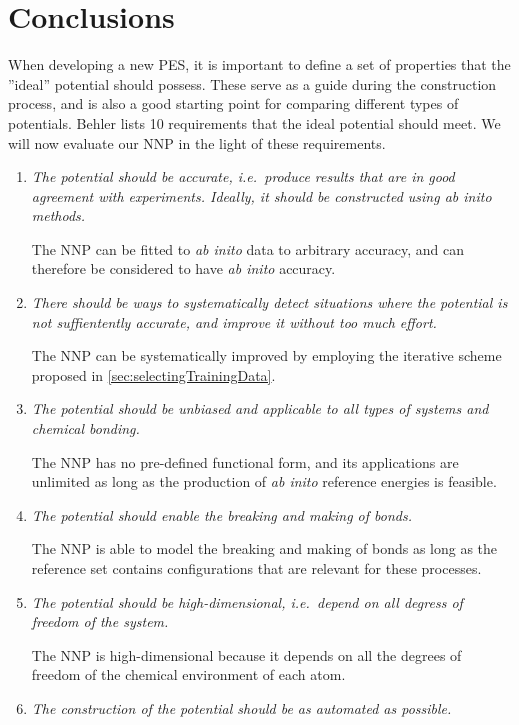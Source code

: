 \documentclass[twoside,english]{uiofysmaster}
\begin{document}
\chapter{Conclusions} 
When developing a new PES, it is important to define a set of properties that the ''ideal'' potential 
should possess. These serve as a guide during the construction process, and is also a good 
starting point for comparing different types of potentials. Behler \cite{Behler11general} lists 10 requirements
that the ideal potential should meet. We will now evaluate our NNP in the light of these requirements. 
\begin{enumerate}
 \item \textit{The potential should be accurate, i.e.\ produce results that are in good agreement with experiments. 
       Ideally, it should be constructed using \textit{ab inito} methods.} 
       
       The NNP can be fitted to \textit{ab inito} data to arbitrary accuracy, and 
       can therefore be considered to have \textit{ab inito} accuracy.  
 \item \textit{There should be ways to systematically detect situations where the potential is not suffientently accurate, 
       and improve it without too much effort.} 
       
       The NNP can be systematically improved by employing the iterative scheme proposed in \autoref{sec:selectingTrainingData}.
 \item \textit{The potential should be unbiased and applicable to all types of systems and chemical bonding.} 
       
       The NNP has no pre-defined functional form, and its applications are unlimited as 
       long as the production of \textit{ab inito} reference energies is feasible. 
 \item \textit{The potential should enable the breaking and making of bonds.}
       
       The NNP is able to model the breaking and making of bonds as long as the reference set contains
       configurations that are relevant for these processes.  
 \item \textit{The potential should be high-dimensional, i.e.\ depend on all degress of freedom of the system.}
       
       The NNP is high-dimensional because it depends on all the degrees of freedom of the chemical environment of each atom. 
 \item \textit{The construction of the potential should be as automated as possible.} 
       

\end{enumerate}
\end{document}
